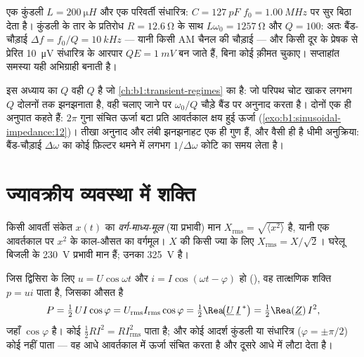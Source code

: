 \begin{example}[रेडियो सुर में बिठाना]\label{ex:b1:sinusoidal-impedance:radio}
एक कुंडली $L = \qty{200}{\micro H}$ और एक परिवर्ती संधारित्र: $C =
\qty{127}{pF}$ $f_0 = \qty{1.00}{MHz}$ पर सुर बिठा देता है। कुंडली के तार के
प्रतिरोध $R = \qty{12.6}{\ohm}$ के साथ $L\omega_0 = \qty{1257}{\ohm}$ और
$Q = 100$: अतः बैंड-चौड़ाई $\Delta f = f_0/Q = \qty{10}{kHz}$ --- यानी किसी
AM चैनल की चौड़ाई --- और किसी दूर के प्रेषक से प्रेरित \qty{10}{\micro V}
संधारित्र के आरपार $QE = \qty{1}{mV}$ बन जाते हैं, बिना कोई क़ीमत
चुकाए। सप्ताहांत समस्या यही अभिग्राही बनाती है।
\end{example}

\begin{remark}[$Q$ फिर से क्यों]\label{rem:b1:sinusoidal-impedance:Q}
इस अध्याय का $Q$ वही $Q$ है जो \cref{ch:b1:transient-regimes} का है:
जो परिपथ चोट खाकर लगभग $Q$ दोलनों तक झनझनाता है, वही चलाए जाने पर
$\omega_0/Q$ चौड़े बैंड पर अनुनाद करता है। दोनों एक ही अनुपात कहते हैं:
$2\pi$ गुना संचित ऊर्जा बटा प्रति आवर्तकाल क्षय हुई ऊर्जा
(\cref{exo:b1:sinusoidal-impedance:12})। तीखा अनुनाद और लंबी झनझनाहट एक ही
गुण हैं, और वैसी ही है धीमी अनुक्रिया: बैंड-चौड़ाई $\Delta\omega$ का कोई
फ़िल्टर थमने में लगभग $1/\Delta\omega$ कोटि का समय लेता है।
\end{remark}

\section{ज्यावक्रीय व्यवस्था में शक्ति}

\begin{definition}[वर्ग-माध्य-मूल मान]\label{def:b1:sinusoidal-impedance:rms}
किसी आवर्ती संकेत $x(t)$ का \emph{वर्ग-माध्य-मूल} (या प्रभावी)
मान $X_{\mathrm{rms}} = \sqrt{\langle x^2\rangle}$ है, यानी एक
आवर्तकाल पर $x^2$ के काल-औसत का वर्गमूल।  $X$ की किसी ज्या
के लिए $X_{\mathrm{rms}} = X/\sqrt2$। घरेलू बिजली के \qty{230}{V}
प्रभावी मान हैं; उनका  \qty{325}{V} है।
\end{definition}

\begin{theorem}[औसत शक्ति]\label{thm:b1:sinusoidal-impedance:power}
जिस द्विसिरा के लिए $u = U\cos\omega t$ और $i = I\cos(\omega t - \varphi)$ हो
(), वह तात्क्षणिक शक्ति $p = ui$ पाता है, जिसका
औसत है
\[
P = \tfrac12\,UI\cos\varphi = U_{\mathrm{rms}}I_{\mathrm{rms}}\cos\varphi
= \tfrac12\Rea\!\big(\underline U\,\underline I^{\,*}\big) = \tfrac12\Rea(\underline Z)\,I^2,
\]
जहाँ $\cos\varphi$ \emph{} है।
कोई  $\tfrac12 RI^2 = RI_{\mathrm{rms}}^2$ पाता है;
और कोई आदर्श कुंडली या संधारित्र ($\varphi = \pm\pi/2$)
कोई  नहीं पाता --- वह आधे आवर्तकाल में ऊर्जा
संचित करता है और दूसरे आधे में लौटा देता है।
\end{theorem}

